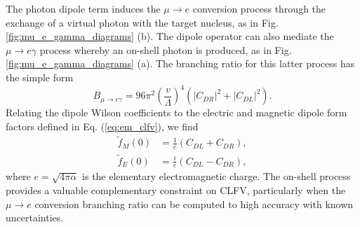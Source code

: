 \documentclass[12pt,letterpaper]{book}
\begin{document}
The photon dipole term induces the $\mu\rightarrow e$ conversion process through the exchange of a virtual photon with the target nucleus, as in Fig. \ref{fig:mu_e_gamma_diagrams} (b). The dipole operator can also mediate the $\mu\rightarrow e\gamma$ process whereby an on-shell photon is produced, as in Fig. \ref{fig:mu_e_gamma_diagrams} (a). The branching ratio for this latter process has the simple form 
\begin{equation}
B_{\mu\rightarrow e\gamma}=96\pi^2\left(\frac{v}{\Lambda}\right)^4\left(|C_{DR}|^2+|C_{DL}|^2\right).
\end{equation} 
Relating the dipole Wilson coefficients to the electric and magnetic dipole form factors defined in Eq. (\ref{eq:em_clfv}), we find
\begin{equation}
\begin{split}
\tilde{f}_M(0)&=\frac{1}{e}\left(C_{DL}+C_{DR}\right),\\
\tilde{f}_E(0)&=\frac{i}{e}\left(C_{DL}-C_{DR}\right),
\end{split}
\end{equation}
where $e=\sqrt{4\pi\alpha}$ is the elementary electromagnetic charge. The on-shell process provides a valuable complementary constraint on CLFV, particularly when the $\mu\rightarrow e$ conversion branching ratio can be computed to high accuracy with known uncertainties.
\end{document}
